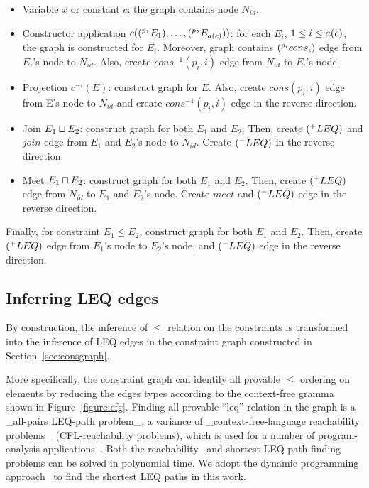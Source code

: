\begin{itemize}
\item Variable $x$ or constant $c$: the graph contains node $N_{id}$. 

\item Constructor application $c((^{p_1}E_1), \dots,
(^{p_2}E_{a(c)}))$: for each $E_i$, $1\leq i \leq a(c)$,
the graph is constructed for $E_i$. Moreover, graph contains
$(^{p_i}cons_i)$ edge from $E_i$'s node to $N_{id}$.  Also, create
$cons^{-1}(p_i,i)$ edge from $N_{id}$ to $E_i$'s node.

\item Projection $c^{-i}(E)$: construct graph for $E$. Also, create
$cons(p_i,i)$ edge from E's node to $N_{id}$ and create $cons^{-1}(p_i,i)$ edge
in the reverse direction.

\item Join $E_1\sqcup E_2$: construct graph for both $E_1$ and $E_2$. Then,
create $(^{+}LEQ)$ and $join$ edge from $E_1$ and $E_2$'s node to
$N_{id}$. Create $(^{-}LEQ)$ in the reverse direction.

\item Meet $E_1\sqcap E_2$: construct graph for both $E_1$ and $E_2$. Then,
create $(^{+}LEQ)$ edge from $N_{id}$ to $E_1$ and $E_2$'s node. Create
$meet$ and $(^{-}LEQ)$ edge in the reverse direction.
\end{itemize}

Finally, for constraint $E_1\leq E_2$, construct graph for both $E_1$ and $E_2$. Then,
create $(^{+}LEQ)$ edge from $E_1$'s node to $E_2$'s node, and
$(^{-}LEQ)$ edge in the reverse direction.

\subsection{Inferring LEQ edges}
\label{sec:leqedge}

By construction, the inference of $\leq$ relation on the constraints is
transformed into the inference of LEQ edges in the constraint graph constructed
in Section~\ref{sec:consgraph}.

More specifically, the constraint graph can identify all provable $\leq$
ordering on elements by reducing the edges types according to the context-free
gramma shown in Figure~\ref{figure:cfg}. Finding all provable ``leq'' relation
in the graph is a _all-pairs LEQ-path problem_, a variance of
_context-free-language reachability problems_ (CFL-reachability problems),
which is used for a number of program-analysis applications~\cite{reps-graph}.
Both the reachability~\cite{melski-cflgraph} and shortest LEQ path
finding~\cite{barrett-cflpath} problems can be solved in polynomial time. We
adopt the dynamic programming approach~\cite{barrett-cflpath} to find the
shortest LEQ paths in this work. 

